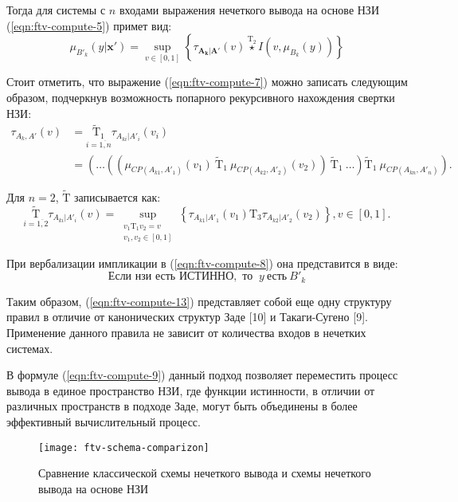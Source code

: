 Тогда для системы с $n$ входами выражения нечеткого вывода на основе НЗИ (\ref{eqn:ftv-compute-5}) примет вид:
\begin{equation}
\label{eqn:ftv-compute-9}
\mu_{B'_k}(y|\mathbf{x'}) = \sup_{v \in [0, 1]} \left\{\tau_{\mathbf{A_k}|\mathbf{A'}}(v) \overset{\mathrm{T_2}}{\star} I(v, \mu_{B_k}(y))\right\}
\end{equation}

Стоит отметить, что выражение (\ref{eqn:ftv-compute-7}) можно записать следующим образом, подчеркнув возможность попарного рекурсивного нахождения свертки НЗИ:
\begin{align*}
\label{eqn:ftv-compute-10}
\tau_{A_k, A'}(v) & = \underset{i=\overline{1,n}}{\mathrm{\tilde{T}_1}}\tau_{A_{ki}|A'_i}(v_i) \\
& = \left(\dots\left(\left(\mu_{CP(A_{k1}, A'_1)}(v_1)\ \mathrm{\tilde{T}_1}\ \mu_{CP(A_{k2}, A'_2)}(v_2)\right)\ \mathrm{\tilde{T}_1}\ \dots \right) \mathrm{\tilde{T}_1}\ \mu_{CP(A_{kn}, A'_n)}\right).
\end{align*}

Для $n=2$, $\mathrm{\tilde{T}}$ записывается как:
\begin{equation}
\underset{i=\overline{1,2}}{\mathrm{\tilde{T}}} \tau_{A_{ki}|A'_i}(v) = \sup_{\substack{v_1 \mathrm{ T_1 } v_2 = v \\ v_1, v_2 \in [0, 1]}} \left\{ \tau_{A_{k1}|A'_1}(v_1) \mathrm{ T_3 } \tau_{A_{k2}|A'_2}(v_2) \right\}, v \in [0,1].
\label{eqn:ftv-compute-11}
\end{equation}

При вербализации импликации в (\ref{eqn:ftv-compute-8}) она представится в виде:
\begin{equation}
\text{Если } \textit{нзи} \text{ есть } \text{ИСТИННО}, \text{ то }\ y\ \text{есть}\ B'_k
\label{eqn:ftv-compute-13}
\end{equation}

Таким образом, (\ref{eqn:ftv-compute-13}) представляет собой еще одну структуру правил в отличие от канонических структур Заде [10] и Такаги-Сугено [9]. Применение данного правила не зависит от количества входов в нечетких системах.

В формуле (\ref{eqn:ftv-compute-9}) данный подход позволяет переместить процесс вывода в единое пространство НЗИ, где функции истинности, в отличии от различных пространств в подходе Заде, могут быть объединены в более эффективный вычислительный процесс.

\begin{figure}
\centering
\texttt{[image: ftv-schema-comparizon]}
\caption{Сравнение классической схемы нечеткого вывода и схемы нечеткого вывода на основе НЗИ}
\label{fig:ftv-schema-comparizon}
\end{figure}

